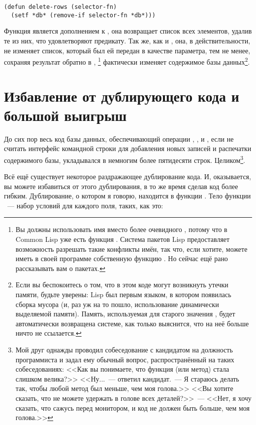 \begin{lstlisting}
(defun delete-rows (selector-fn)
  (setf *db* (remove-if selector-fn *db*)))
\end{lstlisting}

Функция  является дополнением к , она возвращает
список всех элементов, удалив те из них, что удовлетворяют предикату. Так же, как и
, она, в действительности, не изменяет список, который был ей передан
в качестве параметра, тем не менее, сохраняя результат обратно в ,
\footnote{Вы должны использовать имя  вместо более
  очевидного , потому что в Common Lisp уже есть функция
  . Система пакетов Lisp предоставляет возможность разрешать такие
  конфликты имён, так что, если хотите, можете иметь в своей программе собственную функцию
  . Но сейчас ещё рано рассказывать вам о пакетах.} фактически изменяет
содержимое базы данных\footnote{Если вы беспокоитесь о том, что в этом коде могут
  возникнуть утечки памяти, будьте уверены: Lisp был первым языком, в котором появилась
  сборка мусора (и, раз уж на то пошло, использование динамически выделяемой
  памяти). Память, используемая для старого значения , будет автоматически возвращена
  системе, как только выяснится, что на неё больше ничто не ссылается.}.

\section{Избавление от дублирующего кода и большой выигрыш}

До сих пор весь код базы данных, обеспечивающий операции , ,
 и , если не считать интерфейс командной строки для добавления
новых записей и распечатки содержимого базы, укладывался в немногим более пятидесяти
строк. Целиком\footnote{Мой друг однажды проводил собеседование с кандидатом на должность
  программиста и задал ему обычный вопрос, распространённый на таких собеседованиях: <<Как
  вы понимаете, что функция (или метод) стала слишком велика?>> <<Ну...~--- ответил
  кандидат.~--- Я стараюсь делать так, чтобы любой метод был меньше, чем моя голова.>>  <<Вы
  хотите сказать, что не можете удержать в голове всех деталей?>>~--- <<Нет, я хочу сказать,
  что сажусь перед монитором, и код не должен быть больше, чем моя голова.>>}.

Всё ещё существует некоторое раздражающее дублирование кода. И, оказывается, вы можете
избавиться от этого дублирования, в то же время сделав код более гибким. Дублирование, о
котором я говорю, находится в функции . Тело функции ~--- набор
условий для каждого поля, таких, как это:

